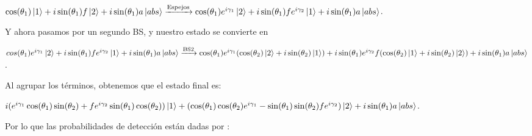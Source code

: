 \documentclass[11pt]{article}
\begin{document}
$\cos
(\theta_
{1})\ket
{1}+i\sin(\theta_
{1})f\ket
{2}+i\sin(\theta_
{1})a\ket
{abs
}\xrightarrow{\text{Espejos}}\cos
(\theta_
{1})e^
{i\gamma_
{1}}\ket
{2}+i\sin(\theta_
{1})f e^
{i\gamma_
{2}}\ket
{1}+i\sin(\theta_
{1})a\ket
{abs
}$.

Y ahora pasamos por un segundo BS, y nuestro estado se convierte en

$cos
(\theta_
{1})e^
{i\gamma_
{1}}\ket
{2}+i\sin(\theta_
{1})f e^
{i\gamma_
{2}}\ket
{1}+i\sin(\theta_
{1})a\ket
{abs
}\xrightarrow{\text{BS2}}\cos
(\theta_
{1})e^
{i\gamma_
{1}}(\cos
(\theta_
{2})\ket
{2}+i\sin(\theta_
{2})\ket
{1})+i\sin(\theta_
{1})e^
{i\gamma_
{2}}f(\cos
(\theta_
{2})\ket
{1}+i\sin(\theta_
{2})\ket
{2})+i\sin(\theta_
{1})a\ket
{abs
}$.

Al agrupar los términos, obtenemos que el estado final es:

$i(e^{i\gamma_{1}}\cos(\theta_{1})\sin(\theta_{2})+f e^{i\gamma_{2}}\sin(\theta_{1})\cos(\theta_{2}))\ket{1}
+(\cos(\theta_{1})\cos(\theta_{2}) e^{i\gamma_{1}}-\sin(\theta_{1})\sin(\theta_{2})f e^{i \gamma_{2}})\ket{2}+i\sin(\theta_{1})a\ket{abs}$.



Por lo que las probabilidades de detección están dadas por : 
\end{document}
